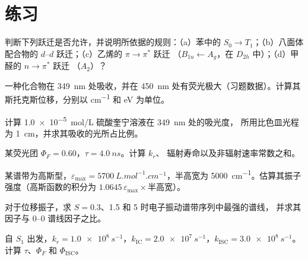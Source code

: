 \section{练习}

\begin{exercise}[$\star$]\label{exo:b3:electronic-spectroscopy:1}
判断下列跃迁是否允许，并说明所依据的规则：（a）苯中的 $S_0 \to T_1$；（b）八面体配合物的 $d$--$d$
跃迁；（c）乙烯的 $\pi\to\pi^*$ 跃迁
（$B_{1u} \leftarrow A_g$，在 $D_{2h}$ 中）；（d）甲醛的 $n\to\pi^*$ 跃迁
（$A_2$）？
\end{exercise}

\begin{exercise}[$\star$]\label{exo:b3:electronic-spectroscopy:2}
一种化合物在 \qty{349}{nm} 处吸收，并在
\qty{450}{nm} 处有荧光极大（习题数据）。计算其斯托克斯位移，分别以 \unit{cm^{-1}}
和 eV 为单位。
\end{exercise}

\begin{exercise}[$\star$]\label{exo:b3:electronic-spectroscopy:3}
计算 \qty{1.0e-5}{mol/L} 硫酸奎宁溶液在 \qty{349}{nm} 处的吸光度，
所用比色皿光程为 \qty{1}{cm}，并求其吸收的光所占比例。
\end{exercise}

\begin{exercise}[$\star$]\label{exo:b3:electronic-spectroscopy:4}
某荧光团 $\Phi_F = 0.60$，$\tau = \qty{4.0}{ns}$。计算 $k_r$、
辐射寿命以及非辐射速率常数之和。
\end{exercise}

\begin{exercise}[$\star\star$]\label{exo:b3:electronic-spectroscopy:5}
某谱带为高斯型，$\varepsilon_{\max} = \qty{5700}{L.mol^{-1}.cm^{-1}}$，半高宽为
\qty{5000}{cm^{-1}}。估算其振子强度（高斯函数的积分为
$1.0645\,\varepsilon_{\max}\times$半高宽）。
\end{exercise}

\begin{exercise}[$\star\star$]\label{exo:b3:electronic-spectroscopy:6}
对于位移振子，求 $S = 0.3$、1.5 和 5 时电子振动谱带序列中最强的谱线，
并求其因子与 0--0 谱线因子之比。
\end{exercise}

\begin{exercise}[$\star\star$]\label{exo:b3:electronic-spectroscopy:7}
自 $S_1$ 出发，$k_r = \qty{1.0e8}{s^{-1}}$，$k_{\mathrm{IC}} = \qty{2.0e7}{s^{-1}}$，$k_{\mathrm{ISC}} =
\qty{3.0e8}{s^{-1}}$。计算 $\tau$、$\Phi_F$ 和 $\Phi_{\mathrm{ISC}}$。
\end{exercise}


